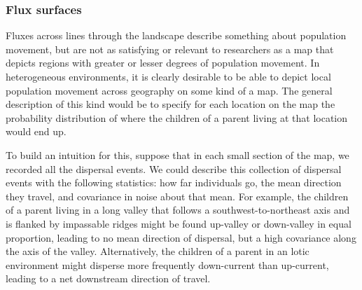 \documentclass{ar-1col}
\newcommand{\plr}[1]{{\color{green}{#1}}}
\newcommand{\todo}[1]{{\textbf{\color{red}{#1}}}}
\newcommand{\E}{\mathbb{E}}
\begin{document}

\todo{tidy and conclude}

\subsubsection{Flux surfaces}

\todo{read through and edit}

Fluxes across lines through the landscape
describe something about population movement,
but are not as satisfying or relevant to researchers
as a map that depicts regions with greater or lesser degrees of population movement.
In heterogeneous environments,
it is clearly desirable to be able to depict local population movement 
across geography on some kind of a map.
The general description of this kind would be 
to specify for each location on the map
the probability distribution of where 
the children of a parent living at that location would end up.

To build an intuition for this,
suppose that in each small section of the map,
we recorded all the dispersal events.
We could describe this collection of dispersal events 
with the following statistics:
how far individuals go,
the mean direction they travel,
and covariance in noise about that mean.
For example, the children of a parent 
living in a long valley that follows a southwest-to-northeast axis 
and is flanked by impassable ridges might be found up-valley 
or down-valley in equal proportion, 
leading to no mean direction of dispersal, 
but a high covariance along the axis of the valley.
Alternatively, the children of a parent in an lotic environment 
might disperse more frequently down-current than up-current, 
leading to a net downstream direction of travel.
\end{document}
